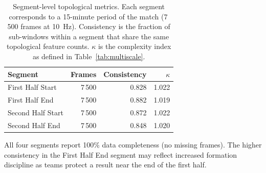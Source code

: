 \documentclass[11pt,a4paper]{article}
\begin{document}
\begin{table}[H]
\centering
\caption{Segment-level topological metrics.  Each segment
  corresponds to a 15-minute period of the match (7\,500
  frames at 10~Hz).  Consistency is the fraction of
  sub-windows within a segment that share the same
  topological feature counts.  \(\kappa\) is the complexity
  index as defined in Table~\ref{tab:multiscale}.}
\label{tab:segments}
\begin{threeparttable}
\begin{tabular}{@{}lrrr@{}}
\toprule
Segment           & Frames & Consistency & \(\kappa\) \\
\midrule
First Half Start  & 7\,500 & 0.828       & 1.022 \\
First Half End    & 7\,500 & 0.882       & 1.019 \\
Second Half Start & 7\,500 & 0.872       & 1.022 \\
Second Half End   & 7\,500 & 0.848       & 1.020 \\
\bottomrule
\end{tabular}
\begin{tablenotes}
\small
\item All four segments report 100\% data completeness
  (no missing frames).  The higher consistency in the
  First Half End segment may reflect increased formation
  discipline as teams protect a result near the end of
  the first half.
\end{tablenotes}
\end{threeparttable}
\end{table}
\end{document}
